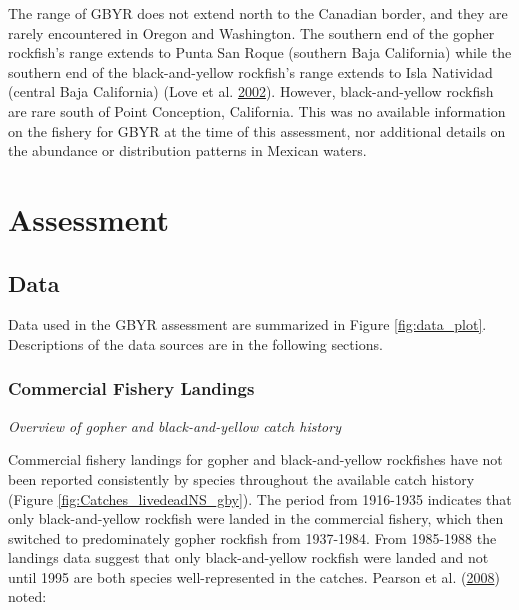 \documentclass[12pt,]{article}
\begin{document}
The range of GBYR does not extend north to the Canadian border, and they
are rarely encountered in Oregon and Washington. The southern end of the
gopher rockfish's range extends to Punta San Roque (southern Baja
California) while the southern end of the black-and-yellow rockfish's
range extends to Isla Natividad (central Baja California) (Love et al.
\protect\hyperlink{ref-Love2002}{2002}). However, black-and-yellow
rockfish are rare south of Point Conception, California. This was no
available information on the fishery for GBYR at the time of this
assessment, nor additional details on the abundance or distribution
patterns in Mexican waters.

\section{Assessment}\label{assessment}

\subsection{Data}\label{data}

Data used in the GBYR assessment are summarized in Figure
\ref{fig:data_plot}. Descriptions of the data sources are in the
following sections.

\subsubsection{Commercial Fishery
Landings}\label{commercial-fishery-landings}

\emph{Overview of gopher and black-and-yellow catch history}

Commercial fishery landings for gopher and black-and-yellow rockfishes
have not been reported consistently by species throughout the available
catch history (Figure \ref{fig:Catches_livedeadNS_gby}). The period from
1916-1935 indicates that only black-and-yellow rockfish were landed in
the commercial fishery, which then switched to predominately gopher
rockfish from 1937-1984. From 1985-1988 the landings data suggest that
only black-and-yellow rockfish were landed and not until 1995 are both
species well-represented in the catches. Pearson et al.
(\protect\hyperlink{ref-Pearson2008}{2008}) noted:
\end{document}
